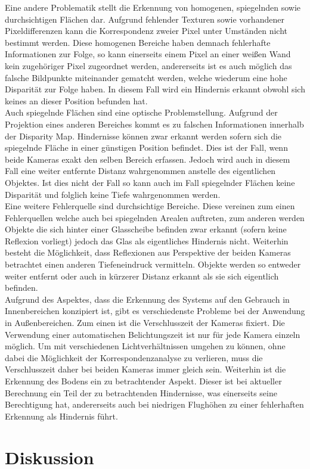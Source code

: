 \noindent
Eine andere Problematik stellt die Erkennung von homogenen, spiegelnden sowie durchsichtigen Flächen dar. Aufgrund fehlender Texturen sowie vorhandener Pixeldifferenzen kann die Korrespondenz zweier Pixel unter Umständen nicht bestimmt werden. Diese homogenen Bereiche haben demnach fehlerhafte Informationen zur Folge, so kann  einerseits einem Pixel an einer weißen Wand kein zugehöriger Pixel zugeordnet werden, andererseits ist es auch möglich das falsche Bildpunkte miteinander gematcht werden, welche wiederum eine hohe Disparität zur Folge haben. In diesem Fall wird ein Hindernis erkannt obwohl sich keines an dieser Position befunden hat.\\
\noindent
Auch spiegelnde Flächen sind eine optische Problemstellung. Aufgrund der Projektion eines anderen Bereiches kommt es zu falschen Informationen innerhalb der Disparity Map. Hindernisse können zwar erkannt werden sofern sich die spiegelnde Fläche in einer günstigen Position befindet. Dies ist der Fall, wenn beide Kameras exakt den selben Bereich erfassen. Jedoch wird auch in diesem Fall eine weiter entfernte Distanz wahrgenommen anstelle des eigentlichen Objektes. Ist dies nicht der Fall so kann auch im Fall spiegelnder Flächen keine Disparität und folglich keine Tiefe wahrgenommen werden.\\
\noindent
Eine weitere Fehlerquelle sind durchsichtige Bereiche. Diese vereinen zum einen Fehlerquellen welche auch bei spiegelnden Arealen auftreten, zum anderen werden Objekte die sich hinter einer Glasscheibe befinden zwar erkannt (sofern keine Reflexion vorliegt) jedoch das Glas als eigentliches Hindernis nicht. Weiterhin besteht die Möglichkeit, dass Reflexionen aus Perspektive der beiden Kameras betrachtet einen anderen Tiefeneindruck vermitteln. Objekte werden so entweder weiter entfernt oder auch in kürzerer Distanz erkannt als sie sich eigentlich befinden.\\

\noindent
Aufgrund des Aspektes, dass die Erkennung des Systems auf den Gebrauch in Innenbereichen konzipiert ist, gibt es verschiedenste Probleme bei der Anwendung in Außenbereichen. Zum einen ist die Verschlusszeit der Kameras fixiert. Die Verwendung einer automatischen Belichtungszeit ist nur für jede Kamera einzeln möglich. Um mit verschiedenen Lichtverhältnissen umgehen zu können, ohne dabei die Möglichkeit der Korrespondenzanalyse zu verlieren, muss die Verschlusszeit daher bei beiden Kameras immer gleich sein. Weiterhin ist die Erkennung des Bodens ein zu betrachtender Aspekt. Dieser ist bei aktueller Berechnung ein Teil der zu betrachtenden Hindernisse, was einerseits seine Berechtigung hat, andererseits auch bei niedrigen Flughöhen zu einer fehlerhaften Erkennung als Hindernis führt. 


\section{Diskussion}
\label{sec:conflict_discussion}
